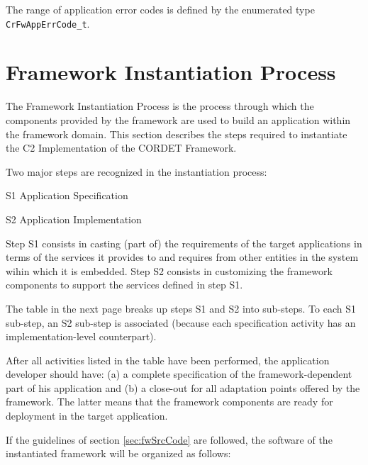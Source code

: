 \documentclass[a4paper,10pt]{article}
\let\stdsection\section
\renewcommand\section{\newpage\stdsection}
\newenvironment{fw_enumerate}					%
{\begin{enumerate}
  \setlength{\itemsep}{1mm}
  \setlength{\parskip}{0pt}
  \setlength{\parsep}{0pt}}
{\end{enumerate}}
\begin{document}
The range of application error codes is defined by the enumerated type \texttt{CrFwAppErrCode\_t}.

\section{Framework Instantiation Process}\label{sec:FwInstantiation}
The Framework Instantiation Process is the process through which the components provided by the framework are used to build an application within the framework domain. This section describes the steps required to instantiate the C2 Implementation of the CORDET Framework.

Two major steps are recognized in the instantiation process: 

\begin{fw_enumerate}
\item[S1] Application Specification
\item[S2] Application Implementation
\end{fw_enumerate}

Step S1 consists in casting (part of) the requirements of the target applications in terms of the services it provides to and requires from other entities in the system wihin which it is embedded. Step S2 consists in customizing the framework components to support the services defined in step S1. 

The table in the next page breaks up steps S1 and S2 into sub-steps. To each S1 sub-step, an S2 sub-step is associated (because each specification activity has an implementation-level counterpart). 

After all activities listed in the table have been performed, the application developer should have: (a) a complete specification of the framework-dependent part of his application and (b) a close-out for all adaptation points offered by the framework. The latter means that the framework components are ready for deployment in the target application. 

If the guidelines of section \ref{sec:fwSrcCode} are followed, the software of the instantiated framework will be organized as follows:
\end{document}
